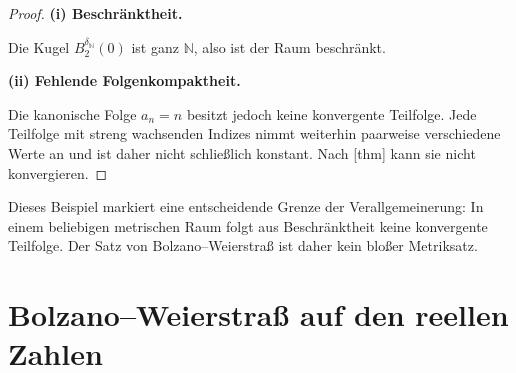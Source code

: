 \documentclass[main.tex]{subfiles}
\begin{document}
\begin{proof}
\par\medskip\noindent\textbf{(i) Beschränktheit.}\par
Die Kugel \(B_2^{\delta_{\mathbb N}}(0)\) ist ganz \(\mathbb N\), also ist
der Raum beschränkt. \par\medskip\noindent\textbf{(ii) Fehlende Folgenkompaktheit.}\par
Die kanonische Folge \(a_n=n\) besitzt jedoch keine
konvergente Teilfolge. Jede Teilfolge mit streng wachsenden Indizes nimmt
weiterhin paarweise verschiedene Werte an und ist daher nicht schließlich
konstant. Nach
[thm] kann sie
nicht konvergieren.
\end{proof}

Dieses Beispiel markiert eine entscheidende Grenze der Verallgemeinerung:
In einem beliebigen metrischen Raum folgt aus Beschränktheit keine
konvergente Teilfolge. Der Satz von Bolzano--Weierstraß ist daher kein bloßer
Metriksatz.

\section{Bolzano--Weierstraß auf den reellen Zahlen}
\end{document}
